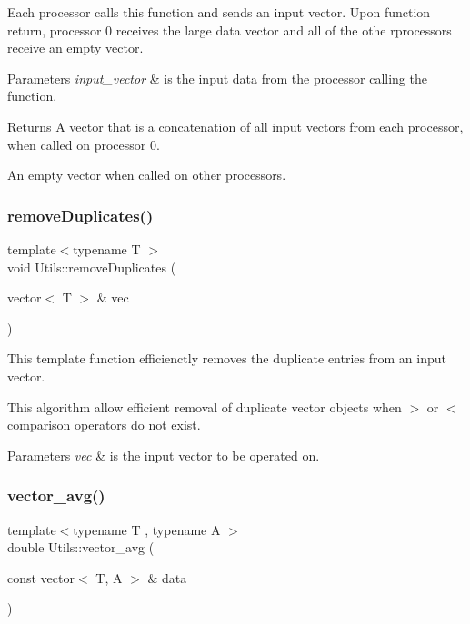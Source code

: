 Each processor calls this function and sends an input vector. Upon function return, processor 0 receives the large data vector and all of the othe rprocessors receive an empty vector. 
\begin{DoxyParams}{Parameters}
{\em input\+\_\+vector} & is the input data from the processor calling the function. \\
\hline
\end{DoxyParams}
\begin{DoxyReturn}{Returns}
A vector that is a concatenation of all input vectors from each processor, when called on processor 0. 

An empty vector when called on other processors. 
\end{DoxyReturn}
\mbox{\label{namespace_utils_ae6b61a9030cf09d8cba2566a42c871df}} 
\subsubsection{\texorpdfstring{remove\+Duplicates()}{removeDuplicates()}}
{\footnotesize\ttfamily template$<$typename T $>$ \\
void Utils\+::remove\+Duplicates (\begin{DoxyParamCaption}\item[{vector$<$ T $>$ \&}]{vec }\end{DoxyParamCaption})}



This template function efficienctly removes the duplicate entries from an input vector. 

This algorithm allow efficient removal of duplicate vector objects when $>$ or $<$ comparison operators do not exist. 
\begin{DoxyParams}{Parameters}
{\em vec} & is the input vector to be operated on. \\
\hline
\end{DoxyParams}
\mbox{\label{namespace_utils_aadb08a5b50d04b076f4348a8f752932b}} 
\subsubsection{\texorpdfstring{vector\+\_\+avg()}{vector\_avg()}}
{\footnotesize\ttfamily template$<$typename T , typename A $>$ \\
double Utils\+::vector\+\_\+avg (\begin{DoxyParamCaption}\item[{const vector$<$ T, A $>$ \&}]{data }\end{DoxyParamCaption})}

